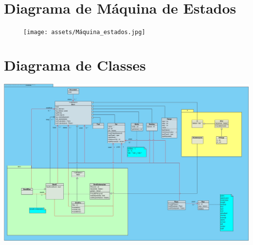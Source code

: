 \documentclass[11pt]{report}
\begin{document}
\section{Diagrama de Máquina de Estados}
\begin{figure}
    \centering
    \texttt{[image: assets/Máquina\_estados.jpg]}
\end{figure}

\section{Diagrama de Classes}
\begin{landscape}
    \centering
    \includegraphics[width=\linewidth]{assets/class_diagram.jpg}
\end{landscape}
%
%
%
% 
% 


\end{document}
